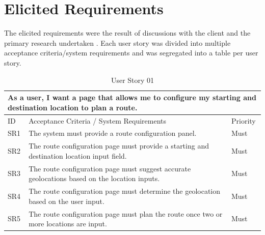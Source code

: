 \clearpage
\section{Elicited Requirements}
\label{requirements:user-stories}

The elicited requirements were the result of discussions with the client and the primary research undertaken . Each user story was divided into multiple acceptance criteria/system requirements and was segregated into a table per user story.

\begin{table}[!htb]
  \caption{User Story 01}
  \label{tab:user-story-01}
  \begin{tabular}{ m{1cm} m{11cm} m{1cm} }
  \hline
  \multicolumn{3}{p{13cm}}{As a user, I want a page that allows me to configure my starting and destination location to plan a route.}\\ 
  \hline
  ID & Acceptance Criteria / System Requirements & Priority\\
  \hline
  \label{SR:1}SR1 & The system must provide a route configuration panel. & Must \\
  \label{SR:2}SR2 & The route configuration page must provide a starting and destination location input field. & Must\\
  \label{SR:3}SR3 & The route configuration page must suggest accurate geolocations based on the location inputs. & Must\\ 
  \label{SR:4}SR4 & The route configuration page must determine the geolocation based on the user input. & Must\\ 
  \label{SR:5}SR5 & The route configuration page must plan the route once two or more locations are input. & Must\\ 
  \hline
  \end{tabular}
\end{table}

